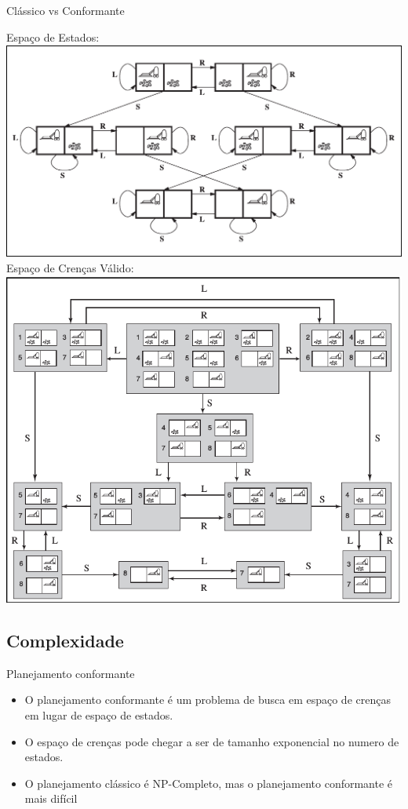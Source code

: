 \begin{frame}{Clássico vs Conformante}

    \begin{multicols}{2}
        \centering
        Espaço de Estados:
        \includegraphics[scale=0.25]{images/space_of_states.png}
    \columnbreak
        Espaço de Crenças Válido:
        \includegraphics[scale=0.25]{images/belief_space.png}
    \end{multicols}
    
\end{frame}


\subsection{Complexidade}
\begin{frame}{Planejamento conformante}
\begin{itemize}
 \item O planejamento conformante é um problema de busca em espaço de crenças em 
lugar de espaço de estados.
 \item O espaço de crenças pode chegar a ser de tamanho exponencial no numero de 
estados. 
 \item O planejamento clássico é NP-Completo, mas o planejamento conformante é 
mais difícil
\end{itemize}
\end{frame}

